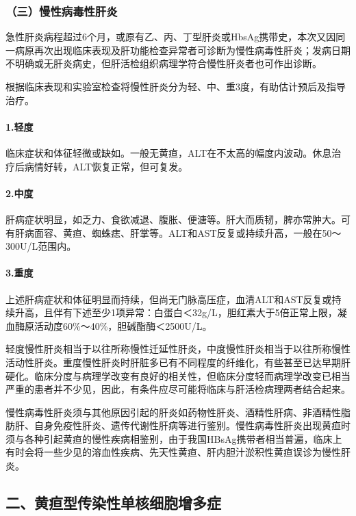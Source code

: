 \subsubsection{（三）慢性病毒性肝炎}

急性肝炎病程超过6个月，或原有乙、丙、丁型肝炎或HbsAg携带史，本次又因同一病原再次出现临床表现及肝功能检查异常者可诊断为慢性病毒性肝炎；发病日期不明确或无肝炎病史，但肝活检组织病理学符合慢性肝炎者也可作出诊断。

根据临床表现和实验室检查将慢性肝炎分为轻、中、重3度，有助估计预后及指导治疗。

\paragraph{1.轻度}

临床症状和体征轻微或缺如。一般无黄疸，ALT在不太高的幅度内波动。休息治疗后病情好转，ALT恢复正常，但可复发。

\paragraph{2.中度}

肝病症状明显，如乏力、食欲减退、腹胀、便溏等。肝大而质韧，脾亦常肿大。可有肝病面容、黄疸、蜘蛛痣、肝掌等。ALT和AST反复或持续升高，一般在50～300U/L范围内。

\paragraph{3.重度}

上述肝病症状和体征明显而持续，但尚无门脉高压症，血清ALT和AST反复或持续升高，且伴有下述至少1项异常：白蛋白＜32g/L，胆红素大于5倍正常上限，凝血酶原活动度60\%～40\%，胆碱酯酶＜2500U/L。

轻度慢性肝炎相当于以往所称慢性迁延性肝炎，中度慢性肝炎相当于以往所称慢性活动性肝炎。重度慢性肝炎时肝脏多已有不同程度的纤维化，有些甚至已达早期肝硬化。临床分度与病理学改变有良好的相关性，但临床分度轻而病理学改变已相当严重的患者并不少见，因此，有条件应尽可能将临床与肝活检病理两者结合起来。

慢性病毒性肝炎须与其他原因引起的肝炎如药物性肝炎、酒精性肝病、非酒精性脂肪肝、自身免疫性肝炎、遗传代谢性肝病等进行鉴别。慢性病毒性肝炎出现黄疸时须与各种引起黄疸的慢性疾病相鉴别，由于我国HBsAg携带者相当普遍，临床上有时会将一些少见的溶血性疾病、先天性黄疸、肝内胆汁淤积性黄疸误诊为慢性肝炎。

\subsection{二、黄疸型传染性单核细胞增多症}


